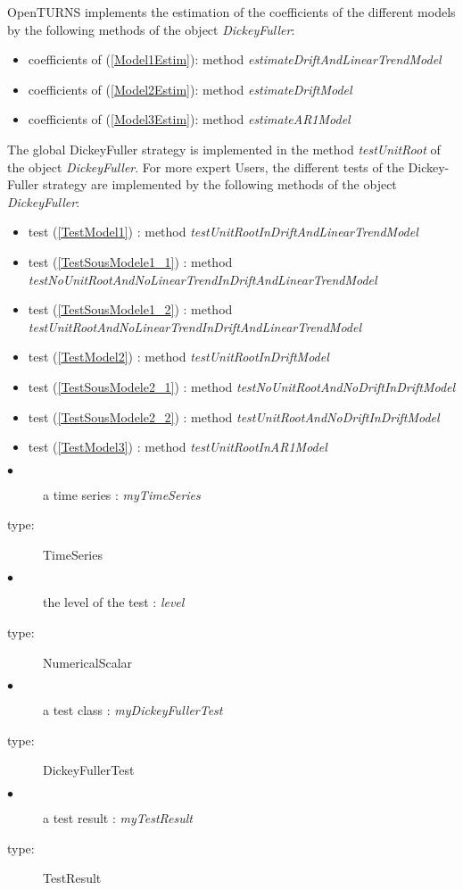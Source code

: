 OpenTURNS implements the estimation of the coefficients of the different models by the following methods of the object \emph{DickeyFuller}:
\begin{itemize}
\item coefficients of (\ref{Model1Estim}): method \emph{estimateDriftAndLinearTrendModel}
\item coefficients of (\ref{Model2Estim}): method \emph{estimateDriftModel}
\item coefficients of (\ref{Model3Estim}): method \emph{estimateAR1Model}
\end{itemize}


The global DickeyFuller strategy  is implemented in the method \emph{testUnitRoot} of the object \emph{DickeyFuller}. For more expert Users, the different tests of the Dickey-Fuller strategy are implemented by the following methods of the object \emph{DickeyFuller}:
\begin{itemize}
\item test (\ref{TestModel1}) : method \emph{testUnitRootInDriftAndLinearTrendModel}
\item test (\ref{TestSousModele1_1}) : method \emph{testNoUnitRootAndNoLinearTrendInDriftAndLinearTrendModel}
\item test (\ref{TestSousModele1_2}) : method \emph{testUnitRootAndNoLinearTrendInDriftAndLinearTrendModel}
\item test (\ref{TestModel2}) : method \emph{testUnitRootInDriftModel}
\item test (\ref{TestSousModele2_1}) : method \emph{testNoUnitRootAndNoDriftInDriftModel}
\item test (\ref{TestSousModele2_2}) : method \emph{testUnitRootAndNoDriftInDriftModel}
\item test (\ref{TestModel3}) : method \emph{testUnitRootInAR1Model}
\end{itemize}


\requirements
    {
      \begin{description}
      \item[$\bullet$] a time series : {\itshape myTimeSeries}
      \item[type:]  TimeSeries
      \end{description}

      \begin{description}
      \item[$\bullet$] the level of the test : {\itshape level}
      \item[type:]  NumericalScalar
      \end{description}
    }
    {
      \begin{description}
      \item[$\bullet$] a test class : {\itshape myDickeyFullerTest}
      \item[type:]  DickeyFullerTest
      \end{description}

      \begin{description}
      \item[$\bullet$] a test result : {\itshape myTestResult}
      \item[type:]  TestResult
      \end{description}
    }

